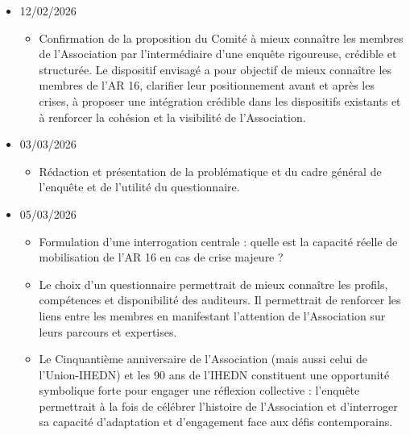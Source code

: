 \documentclass[10pt,a4paper]{article}
\begin{document}
\begin{itemize}
\begin{itemize}
\item L'annuaire de l'Union IHEDN représente un vivier significatif de compétences et d'expertise, susceptible de constituer le socle d'un dispositif structuré de préparation aux crises et de retour d'expérience.
\item La réflexion menée permet d'aboutir à une proposition concrète de la part de notre comité : l'élaboration d'un questionnaire à destination des Auditeurs de l'IHEDN. Ce questionnaire a pour objectif de cartographier les ressources disponibles, leurs domaines d'expertise, les profils volontaires pour intégrer un dispositif d'appui.
\item Un calendrier prévisionnel de cette démarche est envisagé après consultation de l'IRSEM.
\item Le Comité sollicitera l'accord de la Gouvernance de l'AR 16.
\end{itemize}
\item 12/02/2026
\begin{itemize}
\item Confirmation de la proposition du Comité à mieux connaître les membres de l'Association par l'intermédiaire d'une enquête rigoureuse, crédible et structurée. Le dispositif envisagé a pour objectif de mieux connaître les membres de l'AR 16, clarifier leur positionnement avant et après les crises, à proposer une intégration crédible dans les dispositifs existants et à renforcer la cohésion et la visibilité de l'Association.
\end{itemize}
\item 03/03/2026
\begin{itemize}
\item Rédaction et présentation de la problématique et du cadre général de l'enquête et de l'utilité du questionnaire.
\end{itemize}
\item 05/03/2026
\begin{itemize}
\item Formulation d'une interrogation centrale : quelle est la capacité réelle de mobilisation de l'AR 16 en cas de crise majeure ?
\item Le choix d'un questionnaire permettrait de mieux connaître les profils, compétences et disponibilité des auditeurs. Il permettrait de renforcer les liens entre les membres en manifestant l'attention de l'Association sur leurs parcours et expertises.
\item Le Cinquantième anniversaire de l'Association (mais aussi celui de l'Union-IHEDN) et les 90 ans de l'IHEDN constituent une opportunité symbolique forte pour engager une réflexion collective : l'enquête permettrait à la fois de célébrer l'histoire de l'Association et d'interroger sa capacité d'adaptation et d'engagement face aux défis contemporains.

\end{itemize}
\end{itemize}
\end{document}
